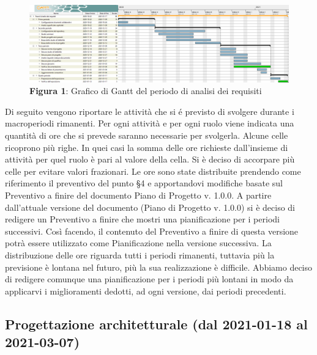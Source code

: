 \begin{landscape}
	\begin{figure}[H]
		\centering
		\includegraphics[width=\linewidth]{res/images/ganttFase1.png}
		\caption*{\textbf{Figura 1}{: Grafico di Gantt del periodo di analisi dei requisiti}}
		\label{fig:Gantt Analisi dei requisiti}
	\end{figure}
\end{landscape}



\noindent Di seguito vengono riportare le attività che si é previsto di svolgere durante i macroperiodi rimanenti. Per ogni attività e per ogni ruolo viene indicata una quantità di ore che si prevede saranno necessarie per svolgerla. Alcune celle ricoprono più righe. In quei casi la somma delle ore richieste dall'insieme di attività per quel ruolo è pari al valore della cella. Si è deciso di accorpare più celle per evitare valori frazionari. \newline
\indent Le ore sono state distribuite prendendo come riferimento il preventivo del punto §4 e apportandovi modifiche basate sul Preventivo a finire del documento Piano di Progetto v. 1.0.0. A partire dall'attuale versione del documento (Piano di Progetto v. 1.0.0) si è deciso di redigere un Preventivo a finire che mostri una pianificazione per i periodi successivi. Così facendo, il contenuto del Preventivo a finire di questa versione potrà essere utilizzato come Pianificazione nella versione successiva. \newline
\indent La distribuzione delle ore riguarda tutti i periodi rimanenti, tuttavia più la previsione è lontana nel futuro, più la sua realizzazione è difficile. Abbiamo deciso di redigere comunque una pianificazione per i periodi più lontani in modo da applicarvi i miglioramenti dedotti, ad ogni versione, dai periodi precedenti. \newline

\subsection{Progettazione architetturale (dal 2021-01-18 al 2021-03-07)}

